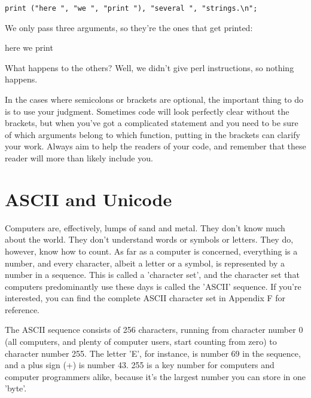 \documentclass[a4paper,12pt,twoside]{book}
\begin{document}
\noindent \texttt{print ("here ", "we ", "print "), "several ", "strings.\textbackslash n";}

\noindent 

\noindent We only pass three arguments, so they're the ones that get printed:

\noindent 

\noindent here we print

\noindent 

\noindent What happens to the others? Well, we didn't give perl instructions, so nothing happens.

\noindent 

\noindent In the cases where semicolons or brackets are optional, the important thing to do is to use your judgment. Sometimes code will look perfectly clear without the brackets, but when you've got a complicated statement and you need to be sure of which arguments belong to which function, putting in the brackets can clarify your work. Always aim to help the readers of your code, and remember that these reader will more than likely include you.

\noindent 

\section{ASCII and Unicode}

\noindent 

\noindent Computers are, effectively, lumps of sand and metal. They don't know much about the world. They don't understand words or symbols or letters. They do, however, know how to count. As far as a computer is concerned, everything is a number, and every character, albeit a letter or a symbol, is represented by a number in a sequence. This is called a 'character set', and the character set that computers predominantly use these days is called the 'ASCII' sequence. If you're interested, you can find the complete ASCII character set in Appendix F for reference.

\noindent 

\noindent The ASCII sequence consists of 256 characters, running from character number 0 (all computers, and plenty of computer users, start counting from zero) to character number 255. The letter 'E', for instance, is number 69 in the sequence, and a plus sign (+) is number 43. 255 is a key number for computers and computer programmers alike, because it's the largest number you can store in one 'byte'.
\end{document}
